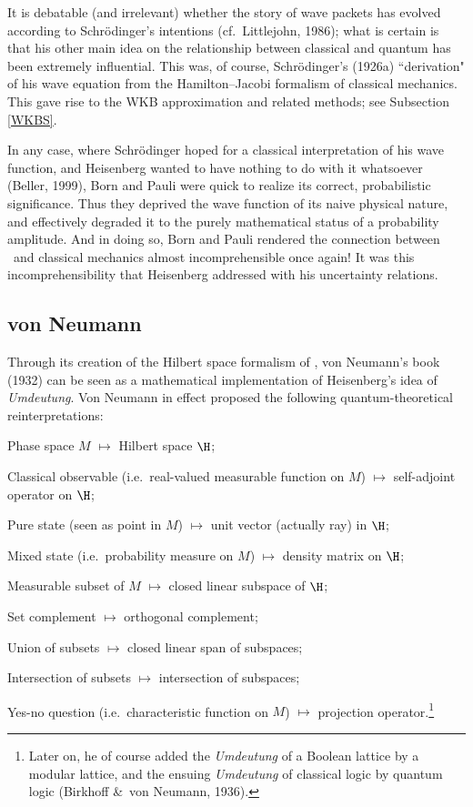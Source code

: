 \documentclass[12pt,titlepage]{article}
\begin{document}
It is debatable (and irrelevant) whether the story of wave packets has evolved 
 according to Schr\"{o}dinger's intentions (cf.\ Littlejohn, 1986); what is certain is that his other main idea on the relationship between classical and quantum has been extremely influential. This was, of course,  Schr\"{o}dinger's (1926a) ``derivation" of his wave equation from the Hamilton--Jacobi formalism of classical mechanics. This  gave rise to the WKB approximation and related methods; see Subsection \ref{WKBS}. 

In any case, where Schr\"{o}dinger hoped for a classical interpretation of his wave function, and Heisenberg wanted to have nothing to do with it whatsoever (Beller, 1999), 
Born and Pauli were quick to realize its correct, probabilistic significance.
Thus they deprived the wave function of its naive physical nature, and effectively 
 degraded it to the purely mathematical status of a probability amplitude.
And in doing so, Born and Pauli rendered the connection between \qm\ and classical mechanics almost incomprehensible once again! It was this incomprehensibility that Heisenberg addressed with his uncertainty relations.  
 \subsection{von Neumann}\label{vNs}
Through its creation of the Hilbert space formalism of \qm,  von Neumann's book  (1932) can be seen as a mathematical implementation of Heisenberg's idea of {\it Umdeutung}. Von Neumann in effect proposed the following quantum-theoretical reinterpretations:
\begin{trivlist}
\item Phase space $M$ $\mathbf{\mapsto}$ Hilbert space $\H$;
\item  Classical observable (i.e.\ real-valued measurable function on $M$)  $\mathbf{\mapsto}$ self-adjoint operator on $\H$;
\item Pure state (seen as point in $M$)  $\mathbf{\mapsto}$ unit vector (actually ray)  in $\H$;
\item Mixed state (i.e.\ probability measure on $M$) $\mathbf{\mapsto}$  density matrix on $\H$;
\item Measurable subset of $M$  $\mathbf{\mapsto}$ closed linear subspace  of $\H$;
\item Set complement  $\mathbf{\mapsto}$ orthogonal complement;
\item Union of subsets  $\mathbf{\mapsto}$ closed linear span of subspaces;
\item Intersection of subsets $\mathbf{\mapsto}$ intersection of subspaces;
\item Yes-no question (i.e.\ characteristic function on $M$) $\mathbf{\mapsto}$ projection operator.\footnote{Later on, he of course added the {\it Umdeutung} of a Boolean lattice by a modular lattice, and  the ensuing {\it Umdeutung} of classical logic by quantum logic (Birkhoff \&\ von Neumann,  1936). }
 \end{trivlist}
\end{document}
